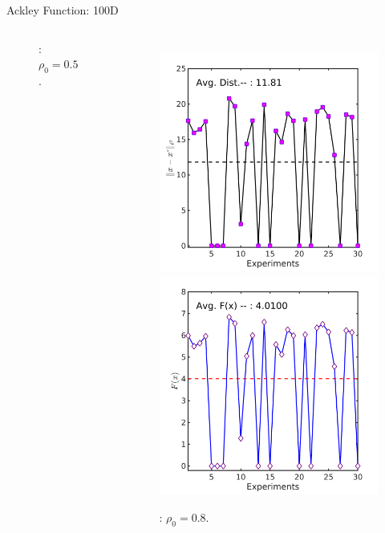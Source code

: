 \documentclass{beamer}
\begin{document}
\begin{frame}{Ackley Function: 100D}
\begin{columns}[c]
\begin{figure}[!htbp]
	  \vspace{-0.2cm}
	  \footnotesize{ \caption{: $\rho_0=0.5$.} }
\end{figure}
	\column{6cm}
\begin{figure}[!htbp]
	\centering
	  \includegraphics[scale=0.1]{./figures/ackley100Drandr0_8_dist.png}
	  \includegraphics[scale=0.1]{./figures/ackley100Drandr0_8_val.png}
	  \vspace{-0.2cm}
	  \footnotesize{ \caption{: $\rho_0=0.8$.} }
\end{figure}
\end{columns}

\end{frame}
\end{document}
